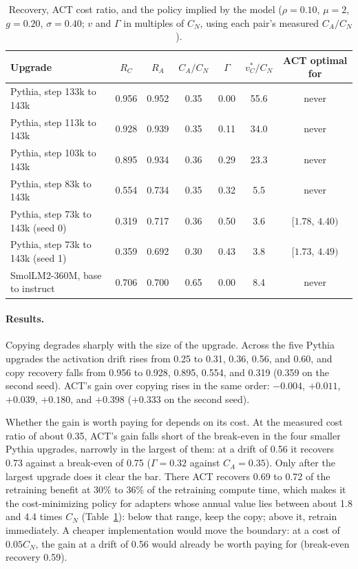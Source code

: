 \documentclass[preprint,12pt,authoryear]{elsarticle}
\begin{document}
\begin{table}[t]
\centering
\caption{Recovery, ACT cost ratio, and the policy implied by the model ($\rho=0.10$, $\mu=2$, $g=0.20$, $\sigma=0.40$; $v$ and $\Gamma$ in multiples of $C_N$, using each pair's measured $C_A/C_N$).}\label{tab:pairs}
\begin{tabular}{lcccccc}
\toprule
Upgrade & $R_C$ & $R_A$ & $C_A/C_N$ & $\Gamma$ & $v^*_C/C_N$ & ACT optimal for\\
\midrule
Pythia, step 133k to 143k & 0.956 & 0.952 & 0.35 & 0.00 & 55.6 & never\\
Pythia, step 113k to 143k & 0.928 & 0.939 & 0.35 & 0.11 & 34.0 & never\\
Pythia, step 103k to 143k & 0.895 & 0.934 & 0.36 & 0.29 & 23.3 & never\\
Pythia, step 83k to 143k & 0.554 & 0.734 & 0.35 & 0.32 & 5.5 & never\\
Pythia, step 73k to 143k (seed 0) & 0.319 & 0.717 & 0.36 & 0.50 & 3.6 & $[1.78,\,4.40)$\\
Pythia, step 73k to 143k (seed 1) & 0.359 & 0.692 & 0.30 & 0.43 & 3.8 & $[1.73,\,4.49)$\\
SmolLM2-360M, base to instruct & 0.706 & 0.700 & 0.65 & 0.00 & 8.4 & never\\
\bottomrule
\end{tabular}
\end{table}

\paragraph{Results.} Copying degrades sharply with the size of the upgrade. Across the five Pythia upgrades the activation drift rises from 0.25 to 0.31, 0.36, 0.56, and 0.60, and
copy recovery falls from 0.956 to 0.928, 0.895, 0.554, and 0.319 (0.359 on the second seed). ACT's gain over copying rises in the same order: $-0.004$, $+0.011$, $+0.039$, $+0.180$, and $+0.398$ ($+0.333$ on the second seed).

Whether the gain is worth paying for depends on its cost. At the measured cost ratio of about 0.35, ACT's gain falls short of the break-even in the four smaller Pythia upgrades, narrowly in the largest of them: at a drift of 0.56 it recovers 0.73 against a break-even of 0.75 ($\Gamma=0.32$ against $C_A=0.35$).
Only after the largest upgrade does it clear the bar. There ACT recovers 0.69 to 0.72 of the retraining benefit at 30\% to 36\% of the retraining compute time, which makes it the cost-minimizing policy for adapters
whose annual value lies between about 1.8 and 4.4 times $C_N$ (Table~\ref{tab:pairs}): below that range, keep the copy; above it, retrain immediately. A cheaper implementation would move the boundary: at a cost of $0.05C_N$, the gain at a drift of 0.56 would already be worth paying for (break-even recovery 0.59).
\end{document}
